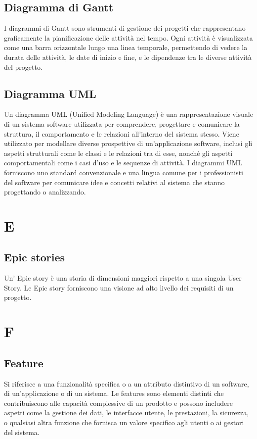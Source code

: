 \documentclass{article}
\begin{document}
\subsection{Diagramma di Gantt}
I diagrammi di Gantt sono strumenti di gestione dei progetti che rappresentano graficamente la pianificazione delle attività nel tempo. Ogni attività è visualizzata come una barra orizzontale lungo una linea temporale, permettendo di vedere la durata delle attività, le date di inizio e fine, e le dipendenze tra le diverse attività del progetto.

\subsection{Diagramma UML}
Un diagramma UML (Unified Modeling Language) è una rappresentazione visuale di un sistema software utilizzata per comprendere, progettare e comunicare la struttura, il comportamento e le relazioni all'interno del sistema stesso. Viene utilizzato per modellare diverse prospettive di un'applicazione software, inclusi gli aspetti strutturali come le classi e le relazioni tra di esse, nonché gli aspetti comportamentali come i casi d'uso e le sequenze di attività. I diagrammi UML forniscono uno standard convenzionale e una lingua comune per i professionisti del software per comunicare idee e concetti relativi al sistema che stanno progettando o analizzando.

\section{E}
\subsection{Epic stories}
Un' Epic story è una storia di dimensioni maggiori rispetto a una singola User Story.
Le Epic story forniscono una visione ad alto livello dei requisiti di un progetto.

\section{F}
\subsection{Feature}
Si riferisce a una funzionalità specifica o a un attributo distintivo di un software, di un'applicazione o di un sistema. Le features sono elementi distinti che contribuiscono alle capacità complessive di un prodotto e possono includere aspetti come la gestione dei dati, le interfacce utente, le prestazioni, la sicurezza, o qualsiasi altra funzione che fornisca un valore specifico agli utenti o ai gestori del sistema. 
\end{document}
